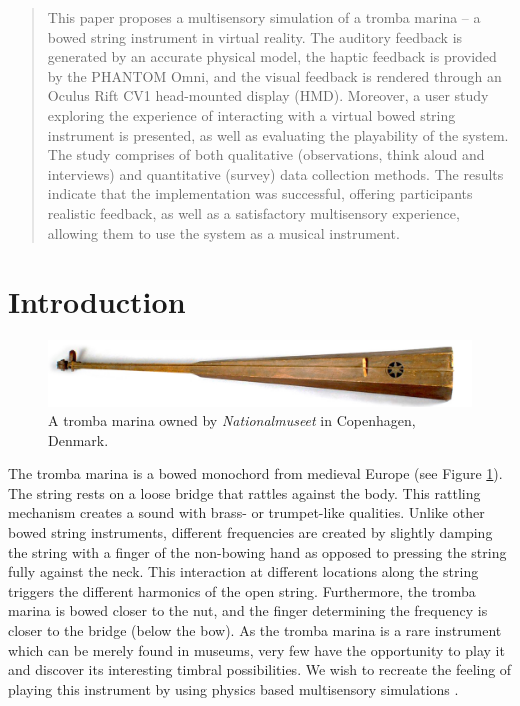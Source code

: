 \begin{abstract}
This paper proposes a multisensory simulation of a tromba marina -- a bowed string instrument in virtual reality. The auditory feedback is generated by an accurate physical model, the haptic feedback is provided by the PHANTOM Omni, and the visual feedback is rendered through an Oculus Rift CV1 head-mounted display (HMD). Moreover, a user study exploring the experience of interacting with a virtual bowed string instrument is presented, as well as evaluating the playability of the system. The study comprises of both qualitative (observations, think aloud and interviews) and quantitative (survey) data collection methods. The results indicate that the implementation was successful, offering participants realistic feedback, as well as a satisfactory multisensory experience, allowing them to use the system as a musical instrument.
\end{abstract}

\section{Introduction}\label{sec:introduction}

\begin{figure}[h]
    \centering
    \includegraphics[width=1.0\columnwidth]{figures/trombaHorizontal.jpg}
    \caption{A tromba marina owned by \textit{Nationalmuseet} in Copenhagen, Denmark.}
    \label{fig:trombaHorizontal}
\end{figure}
The tromba marina is a bowed monochord from medieval Europe \cite{encyclopaedia2020} (see Figure \ref{fig:trombaHorizontal}). The string rests on a loose bridge that rattles against the body. This rattling mechanism creates a sound with brass- or trumpet-like qualities. Unlike other bowed string instruments, different frequencies are created by slightly damping the string with a finger of the non-bowing hand as opposed to pressing the string fully against the neck. This interaction at different locations along the string triggers the different harmonics of the open string. Furthermore, the tromba marina is bowed closer to the nut, and the finger determining the frequency is closer to the bridge (below the bow).
As the tromba marina is a rare instrument which can be merely found in museums, very few have the opportunity to play it and discover its interesting timbral possibilities. 
We wish to recreate the feeling of playing this instrument by using physics based  multisensory simulations \cite{pai2005multisensory}.


